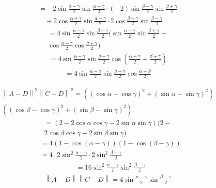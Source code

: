 \documentclass[journal,10pt,twocolumn]{article}
\providecommand{\norm}[1]{\left\lVert#1\right\rVert}
\begin{document}
\begin{multline*}
	= -2\sin\frac{\alpha-\gamma}2\sin\frac{\alpha+\gamma}2 \cdot(-2)\sin\frac{\beta-\gamma}2\sin\frac{\beta+\gamma}2 \\\quad+ 2\cos\frac{\alpha+\gamma}2\sin\frac{\alpha-\gamma}2 \cdot 2\cos\frac{\beta+\gamma}2\sin\frac{\beta-\gamma}2
\end{multline*}
\begin{multline*}
	= 4\sin\frac{\alpha-\gamma}2\sin\frac{\beta-\gamma}2(\sin\frac{\alpha+\gamma}2\sin\frac{\beta+\gamma}2+\\
	\cos\frac{\alpha+\gamma}2\cos\frac{\beta+\gamma}2)
\end{multline*}
\begin{align*}
	= 4\sin\frac{\alpha-\gamma}2\sin\frac{\beta-\gamma}2\cos\left(\frac{\alpha+\gamma}2-\frac{\beta+\gamma}2\right)
\end{align*}
\begin{align}
	= 4\sin\frac{\alpha-\gamma}2\sin\frac{\beta-\gamma}2\cos\frac{\alpha-\beta}2
	\label{pf2-eq-2}
\end{align}

\begin{multline*}
	\norm{A-D}^2\norm{C-D}^2 = ((\cos\alpha-\cos\gamma)^2+(\sin\alpha-\sin\gamma)^2)\\
	((\cos\beta-\cos\gamma)^2+(\sin\beta-\sin\gamma)^2)
\end{multline*}
\begin{multline*}
	= (2-2\cos\alpha\cos\gamma - 2\sin\alpha\sin\gamma)(2-\\
	2\cos\beta\cos\gamma - 2\sin\beta\sin\gamma)
\end{multline*}
\begin{align*}
	&= 4(1-\cos(\alpha-\gamma))(1-\cos(\beta-\gamma))\\
	&= 4\cdot 2\sin^2\frac{\alpha-\gamma}2\cdot 2\sin^2\frac{\beta-\gamma}2
\end{align*}
\begin{align*}
	&= 16 \sin^2\frac{\alpha-\gamma}2\sin^2\frac{\beta-\gamma}2
\end{align*}
\begin{align}
 \norm{A-D}\norm{C-D} = 4 \sin\frac{\alpha-\gamma}2\sin\frac{\beta-\gamma}2
	\label{pf2-eq-3}
\end{align}
\end{document}
